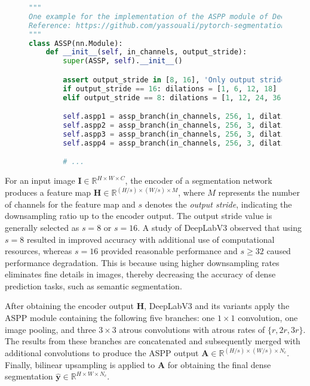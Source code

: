 \documentclass{article}
\newcommand{\R}{\mathbb{R}}
\newcommand{\bI}{\mathbf{I}}
\newcommand{\hby}{\hat{\mathbf{y}}}
\newcommand{\bA}{\mathbf{A}}
\newcommand{\bH}{\mathbf{H}}
\begin{document}
\begin{figure}[t!]
	\begin{lstlisting}[language=Python, label=lst:aspp, caption=One example for the implementation of the ASPP module of DeepLabV3+ \citep{ssp} in PyTorch \citep{DBLP:conf/nips/PaszkeGMLBCKLGA19}.]
"""
One example for the implementation of the ASPP module of DeepLabV3+ in PyTorch.
Reference: https://github.com/yassouali/pytorch-segmentation/blob/master/models/deeplabv3_plus.py
"""
class ASSP(nn.Module):
    def __init__(self, in_channels, output_stride):
        super(ASSP, self).__init__()

        assert output_stride in [8, 16], 'Only output strides of 8 or 16 are suported'
        if output_stride == 16: dilations = [1, 6, 12, 18]
        elif output_stride == 8: dilations = [1, 12, 24, 36]

        self.aspp1 = assp_branch(in_channels, 256, 1, dilation=dilations[0])
        self.aspp2 = assp_branch(in_channels, 256, 3, dilation=dilations[1])
        self.aspp3 = assp_branch(in_channels, 256, 3, dilation=dilations[2])
        self.aspp4 = assp_branch(in_channels, 256, 3, dilation=dilations[3])

        # ...
\end{lstlisting}
\end{figure}

For an input image $\bI \in \R^{H \times W \times C}$, the encoder of a segmentation network produces a feature map $\bH \in \R^{(H/s) \times (W/s) \times M}$, where $M$ represents the number of channels for the feature map and $s$ denotes the \textit{output stride}, indicating the downsampling ratio up to the encoder output. The output stride value is generally selected as $s=8$ or $s=16$. A study of DeepLabV3 \citep{DBLP:journals/corr/ChenPSA17} observed that using $s=8$ resulted in improved accuracy with additional use of computational resources, whereas $s=16$ provided reasonable performance and $s \geq 32$ caused performance degradation. This is because using higher downsampling rates eliminates fine details in images, thereby decreasing the accuracy of dense prediction tasks, such as semantic segmentation.

After obtaining the encoder output $\bH$, DeepLabV3 and its variants apply the ASPP module containing the following five branches: one $1 \times 1$ convolution, one image pooling, and three $3 \times 3$ atrous convolutions with atrous rates of $\{r, 2r, 3r\}$. The results from these branches are concatenated and subsequently merged with additional convolutions to produce the ASPP output $\bA \in \R^{(H/s) \times (W/s) \times N_c}$. Finally, bilinear upsampling is applied to $\bA$ for obtaining the final dense segmentation $\hby \in \R^{H \times W \times N_c}$.
\end{document}
